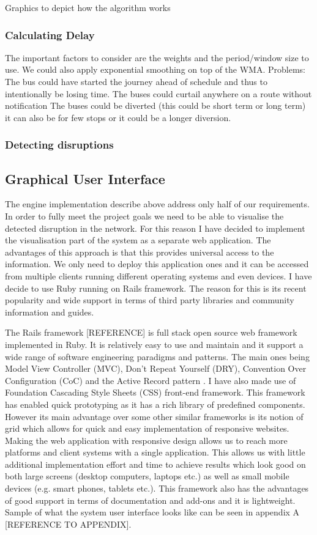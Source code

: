 	Graphics to depict how the algorithm works
	\subsubsection{Calculating Delay}
	The important factors to consider are the weights and the period/window size to use. We could also apply exponential smoothing on top of the WMA.
	Problems:
The bus could have started the journey ahead of schedule and thus to intentionally be losing time.
The buses could curtail anywhere on a route without notification
The buses could be diverted (this could be short term or long term) it can also be for few stops or it could be a longer diversion.

	\subsubsection{Detecting disruptions}
	
\subsection{Graphical User Interface}
The engine implementation describe above address only half of our requirements. In order to fully meet the project goals we need to be able to visualise the detected disruption in the network. For this reason I have decided to implement the visualisation part of the system as a separate web application. The advantages of this approach is that this provides universal access to the information. We only need to deploy this application ones and it can be accessed from multiple clients running different operating systems and even devices. I have decide to use Ruby running on Rails framework. The reason for this is its recent popularity and wide support in terms of third party libraries and community information and guides.

The Rails framework [REFERENCE] is full stack open source web framework implemented in Ruby. It is relatively easy to use and maintain and it support a wide range of software engineering paradigms and patterns. The main ones being Model View Controller (MVC), Don't Repeat Yourself (DRY), Convention Over Configuration (CoC) and the Active Record pattern \cite{fowler2003patterns}. I have also made use of Foundation Cascading Style Sheets (CSS) front-end framework. This framework has enabled quick prototyping as it has a rich library of predefined components. However its main advantage over some other similar frameworks is its notion of grid which allows for quick and easy implementation of responsive websites. Making the web application with responsive design allows us to reach more platforms and client systems with a single application. This allows us with little additional implementation effort and time to achieve results which look good on both large screens (desktop computers, laptops etc.) as well as small mobile devices (e.g. smart phones, tablets etc.). This framework also has the advantages of good support in terms of documentation and add-ons and it is lightweight. Sample of what the system user interface looks like can be seen in appendix A [REFERENCE TO APPENDIX].

